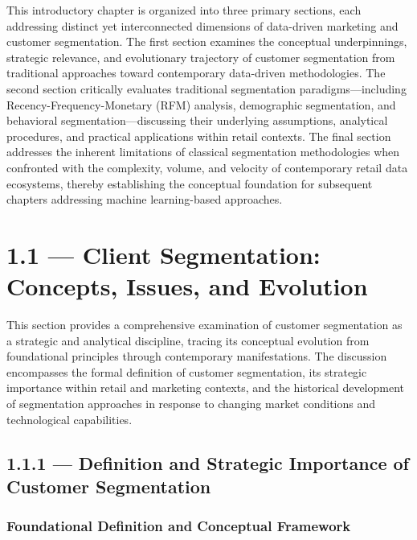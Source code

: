 \documentclass[12pt,a4paper,oneside]{report}
\begin{document}
This introductory chapter is organized into three primary sections, each addressing distinct yet interconnected dimensions of data-driven marketing and customer segmentation. The first section examines the conceptual underpinnings, strategic relevance, and evolutionary trajectory of customer segmentation from traditional approaches toward contemporary data-driven methodologies. The second section critically evaluates traditional segmentation paradigms—including Recency-Frequency-Monetary (RFM) analysis, demographic segmentation, and behavioral segmentation—discussing their underlying assumptions, analytical procedures, and practical applications within retail contexts. The final section addresses the inherent limitations of classical segmentation methodologies when confronted with the complexity, volume, and velocity of contemporary retail data ecosystems, thereby establishing the conceptual foundation for subsequent chapters addressing machine learning-based approaches.

\section{1.1 — Client Segmentation: Concepts, Issues, and Evolution}

This section provides a comprehensive examination of customer segmentation as a strategic and analytical discipline, tracing its conceptual evolution from foundational principles through contemporary manifestations. The discussion encompasses the formal definition of customer segmentation, its strategic importance within retail and marketing contexts, and the historical development of segmentation approaches in response to changing market conditions and technological capabilities.

\subsection{1.1.1 — Definition and Strategic Importance of Customer Segmentation}

\subsubsection{Foundational Definition and Conceptual Framework}
\end{document}
